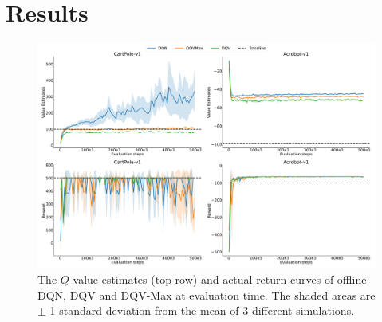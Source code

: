 \section{Results}\label{sec:results}

\begin{figure}[!tbp]
  \centering
  \includegraphics[width=.5\textwidth]{img/dshift_plots_normal.png}
  \caption{The $Q$-value estimates (top row) and actual return curves
    of offline DQN, DQV and DQV-Max at evaluation time. The shaded
    areas are $\pm$ 1 standard deviation from the mean of 3 different
    simulations.}\label{fig:dshift_online_normal}
\end{figure}